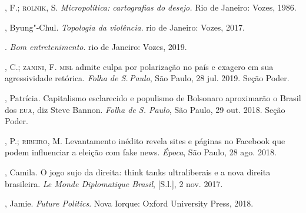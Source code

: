 \begin{bibliohedra}
, F.; \textsc{rolnik}, S. \textit{Micropolítica: cartografias do desejo.}
Rio de Janeiro: Vozes, 1986.

, Byung"-Chul. \textit{Topologia da violência}. rio de Janeiro: Vozes,
2017.

\titidem. \textit{Bom entretenimento}. rio de Janeiro: Vozes, 2019.

, C.; \textsc{zanini}, F. \textsc{mbl} admite culpa por polarização no país e
exagero em sua agressividade retórica. \textit{Folha de S.\,Paulo}, São
Paulo, 28 jul. 2019. Seção Poder.

, Patrícia. Capitalismo esclarecido e populismo de Bolsonaro
aproximarão o Brasil dos \textsc{eua}, diz Steve Bannon. \textit{Folha de S.
Paulo}, São Paulo, 29 out. 2018. Seção Poder. 

, P.; \textsc{ribeiro}, M. Levantamento inédito revela sites e páginas
no Facebook que podem influenciar a eleição com fake news. \textit{Época},
São Paulo, 28 ago. 2018. 

, Camila. O jogo sujo da direita: think tanks ultraliberais e a
nova direita brasileira. \textit{Le Monde Diplomatique Brasil},
{[}S.l.{]}, 2 nov. 2017. 

, Jamie. \textit{Future Politics}. Nova Iorque: Oxford University
Press, 2018.
\end{bibliohedra}

